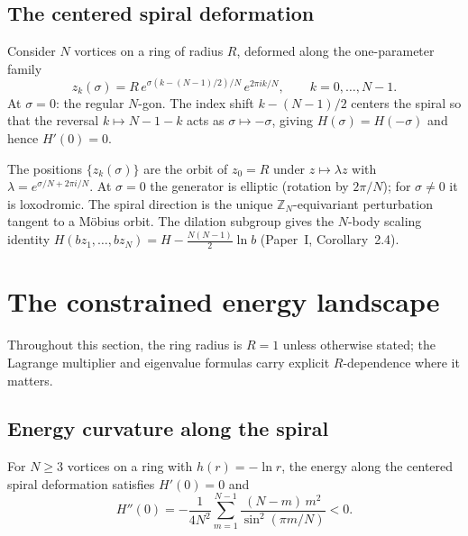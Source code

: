 \subsection{The centered spiral deformation}
\label{sec:spiral-deformation}

Consider $N$ vortices on a ring of radius $R$, deformed along the
one-parameter family
\begin{equation}\label{eq:deformation}
  z_k(\sigma) = R\,e^{\sigma(k - (N-1)/2)/N}\,e^{2\pi ik/N},
  \qquad k = 0, \ldots, N-1.
\end{equation}
At $\sigma = 0$: the regular $N$-gon.  The index shift
$k - (N{-}1)/2$ centers the spiral so that the reversal
$k \mapsto N{-}1{-}k$ acts as $\sigma \mapsto -\sigma$,
giving $H(\sigma) = H(-\sigma)$ and hence $H'(0) = 0$.

\begin{remark}
The positions $\{z_k(\sigma)\}$ are the orbit of $z_0 = R$
under $z \mapsto \lambda z$ with
$\lambda = e^{\sigma/N + 2\pi i/N}$.
At $\sigma = 0$ the generator is elliptic (rotation by $2\pi/N$);
for $\sigma \ne 0$ it is loxodromic.
The spiral direction is the unique $\mathbb{Z}_N$-equivariant
perturbation tangent to a M\"obius orbit.
The dilation subgroup gives the $N$-body scaling identity
$H(bz_1,\dots,bz_N) = H - \tfrac{N(N-1)}{2}\ln b$
(Paper~I, Corollary~2.4).
\end{remark}


\section{The constrained energy landscape}
\label{sec:energy-landscape}

Throughout this section, the ring radius is $R = 1$ unless
otherwise stated; the Lagrange multiplier and eigenvalue formulas
carry explicit $R$-dependence where it matters.

\subsection{Energy curvature along the spiral}

\begin{theorem}\label{thm:energy-curv}
For $N \ge 3$ vortices on a ring with $h(r) = -\ln r$, the energy
along the centered spiral deformation satisfies $H'(0) = 0$ and
\begin{equation}\label{eq:Hpp}
  H''(0) = -\frac{1}{4N^2}\sum_{m=1}^{N-1}
    \frac{(N-m)\,m^2}{\sin^2(\pi m/N)} < 0.
\end{equation}
\end{theorem}

